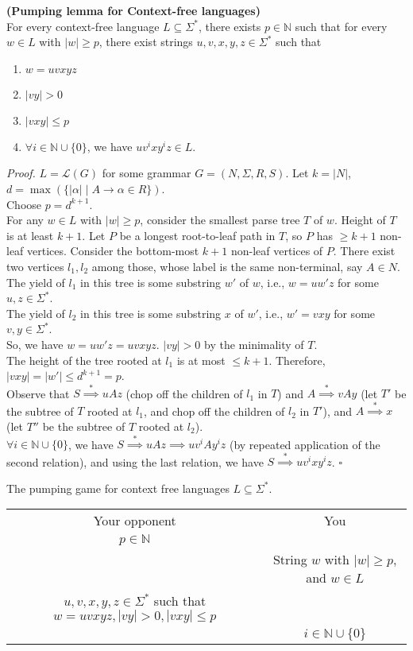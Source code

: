 \documentclass[a4paper]{article}
\newenvironment{proof}{\begin{breakbox}\textit{Proof.}}{\hfill$\square$\end{breakbox}}
\newcommand{\nl}{\vspace{0.2cm}\\}
\newcommand{\mc}{\mathcal}
\newcommand{\mb}{\mathbb}
\renewcommand{\L}{\mc{L}}
\newcommand{\produces}{\implies}
\newcommand{\derives}{\stackrel{*}{\implies}}
\begin{document}
\begin{theorem}
    \textbf{(Pumping lemma for Context-free languages)}\nl
    For every context-free language $L \subseteq \Sigma^*$, there exists $p \in \mb{N}$ such that for every $w \in L$ with $|w| \ge p$, there exist strings $u, v, x, y, z \in \Sigma^*$ such that
    \begin{enumerate}
        \item $w = uvxyz$
        \item $|vy| > 0$
        \item $|vxy| \le p$
        \item $\forall i \in \mb{N} \cup \{0\}$, we have $uv^ixy^iz \in L$.
    \end{enumerate}
\end{theorem}
\begin{proof}
        $L = \L(G)$ for some grammar $G = (N, \Sigma, R, S)$. Let $k = |N|$, $d = \max(\{|\alpha| \mid A \to \alpha \in R\})$.\nl
        Choose $p = d^{k+1}$.\nl
        For any $w \in L$ with $|w| \ge p$, consider the smallest parse tree $T$ of $w$. Height of $T$ is at least $k + 1$. Let $P$ be a longest root-to-leaf path in $T$, so $P$ has $\ge k + 1$
        non-leaf vertices. Consider the bottom-most $k + 1$ non-leaf vertices of $P$. There exist two vertices $l_1, l_2$ among those, whose label is the same non-terminal, say $A \in N$.\nl
        The yield of $l_1$ in this tree is some substring $w'$ of $w$, i.e., $w = uw'z$ for some $u, z \in \Sigma^*$.\nl
        The yield of $l_2$ in this tree is some substring $x$ of $w'$, i.e., $w' = vxy$ for some $v, y \in \Sigma^*$.\nl
        So, we have $w = uw'z = uvxyz$. $|vy| > 0$ by the minimality of $T$.\nl
        The height of the tree rooted at $l_1$ is at most $\le k + 1$. Therefore, $|vxy| = |w'| \le d^{k+1} = p$.\nl
        Observe that $S \derives uAz$ (chop off the children of $l_1$ in $T$) and $A \derives vAy$ (let $T'$ be the subtree of $T$ rooted at $l_1$, and chop off the children of $l_2$ in $T'$), and
        $A \derives x$ (let $T''$ be the subtree of $T$ rooted at $l_2$).\nl
        $\forall i \in \mb{N} \cup \{0\}$, we have $S \derives uAz \produces uv^iAy^iz$ (by repeated application of the second relation), and using the last relation, we have $S \derives
        uv^ixy^iz$.
\end{proof}

The pumping game for context free languages $L \subseteq \Sigma^*$.

\begin{tabular}{|c|c|}
    Your opponent & You \\
    $p\in \mb{N}$ & \\
     & String $w$ with $|w| \ge p$, and $w \in L$  \\
    $u, v, x, y, z \in \Sigma^*$ such that $w = uvxyz, |vy| > 0, |vxy| \le p$ &  \\
                                                                                & $i \in \mb{N} \cup\{0\}$ \\
\end{tabular}
\end{document}
